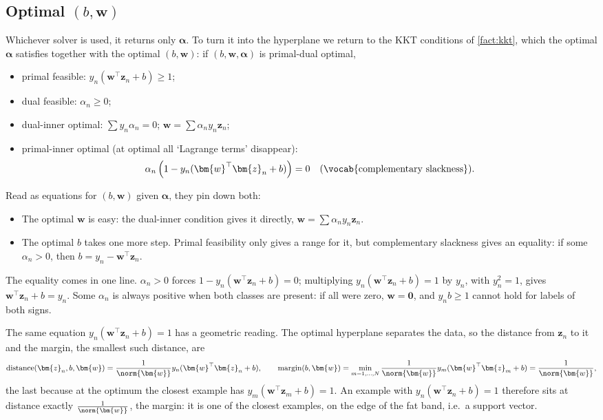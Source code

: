 \subsection{Optimal \texorpdfstring{\((b, \bm{w})\)}{(b, w)}}

Whichever solver is used, it returns only \(\bm{\alpha}\). To turn it into
the hyperplane we return to the KKT conditions of \autoref{fact:kkt}, which
the optimal \(\bm{\alpha}\) satisfies together with the optimal \((b,
\bm{w})\): if \((b, \bm{w}, \bm{\alpha})\) is primal-dual optimal,
\begin{itemize}
    \item primal feasible: \(y_n (\bm{w}^\top \bm{z}_n + b) \ge 1\);
    \item dual feasible: \(\alpha_n \ge 0\);
    \item dual-inner optimal: \(\sum y_n \alpha_n = 0\); \(\bm{w} = \sum
        \alpha_n y_n \bm{z}_n\);
    \item primal-inner optimal (at optimal all `Lagrange terms' disappear):
        \[
            \alpha_n \left( 1 - y_n (\bm{w}^\top \bm{z}_n + b) \right) = 0
            \quad (\text{\vocab{complementary slackness}}).
        \]
\end{itemize}

Read as equations for \((b, \bm{w})\) given \(\bm{\alpha}\), they pin down
both:
\begin{itemize}
    \item The optimal \(\bm{w}\) is easy: the dual-inner condition gives it
        directly, \(\bm{w} = \sum \alpha_n y_n \bm{z}_n\).
    \item The optimal \(b\) takes one more step. Primal feasibility only
        gives a range for it, but complementary slackness gives an equality:
        if some \(\alpha_n > 0\), then \(b = y_n - \bm{w}^\top \bm{z}_n\).
\end{itemize}

The equality comes in one line. \(\alpha_n > 0\) forces \(1 - y_n
(\bm{w}^\top \bm{z}_n + b) = 0\); multiplying \(y_n (\bm{w}^\top \bm{z}_n +
b) = 1\) by \(y_n\), with \(y_n^2 = 1\), gives \(\bm{w}^\top \bm{z}_n + b =
y_n\). Some \(\alpha_n\) is always positive when both classes are present:
if all were zero, \(\bm{w} = \bm{0}\), and \(y_n b \ge 1\) cannot hold for
labels of both signs.

The same equation \(y_n (\bm{w}^\top \bm{z}_n + b) = 1\) has a geometric
reading. The optimal hyperplane separates the data, so the distance from
\(\bm{z}_n\) to it and the margin, the smallest such distance, are
\[
    \operatorname{distance}(\bm{z}_n, b, \bm{w}) = \frac{1}{\norm{\bm{w}}}
    y_n (\bm{w}^\top \bm{z}_n + b),
    \qquad
    \operatorname{margin}(b, \bm{w}) = \min_{m=1,\dots,N}
    \frac{1}{\norm{\bm{w}}} y_m (\bm{w}^\top \bm{z}_m + b) =
    \frac{1}{\norm{\bm{w}}},
\]
the last because at the optimum the closest example has \(y_m
(\bm{w}^\top \bm{z}_m + b) = 1\). An example with \(y_n (\bm{w}^\top
\bm{z}_n + b) = 1\) therefore sits at distance exactly
\(\frac{1}{\norm{\bm{w}}}\), the margin: it is one of the closest examples,
on the edge of the fat band, i.e.\ a support vector.

